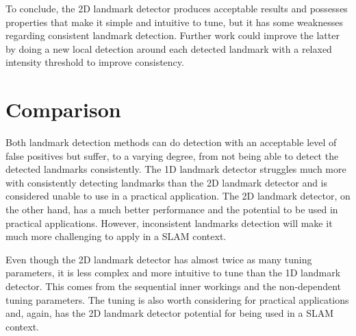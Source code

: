To conclude, the 2D landmark detector produces acceptable results and possesses properties that make it simple and intuitive to tune, but it has some weaknesses regarding consistent landmark detection. Further work could improve the latter by doing a new local detection around each detected landmark with a relaxed intensity threshold to improve consistency.

\section{Comparison}

Both landmark detection methods can do detection with an acceptable level of false positives but suffer, to a varying degree, from not being able to detect the detected landmarks consistently. The 1D landmark detector struggles much more with consistently detecting landmarks than the 2D landmark detector and is considered unable to use in a practical application. The 2D landmark detector, on the other hand, has a much better performance and the potential to be used in practical applications.  However, inconsistent landmarks detection will make it much more challenging to apply in a SLAM context.

Even though the 2D landmark detector has almost twice as many tuning parameters, it is less complex and more intuitive to tune than the 1D landmark detector. This comes from the sequential inner workings and the non-dependent tuning parameters. The tuning is also worth considering for practical applications and, again, has the 2D landmark detector potential for being used in a SLAM context. 
